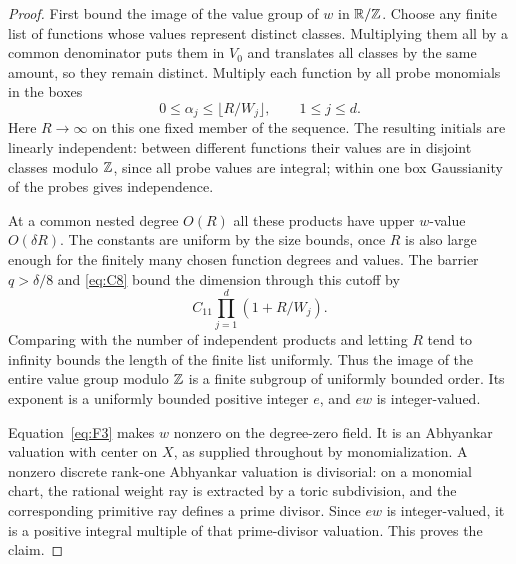 \begin{proof}
First bound the image of the value group of \(w\)
in \(\mathbb R/\mathbb Z\).  Choose any finite list of functions
whose values represent distinct classes.  Multiplying
them all by a common denominator puts them in \(V_0\)
and translates all classes by the same amount, so
they remain distinct.  Multiply each function by
all probe monomials in the boxes
\[
                    0\le\alpha_j\le\lfloor R/W_j\rfloor,
                    \qquad 1\le j\le d.
\]
Here \(R\to\infty\) on this one fixed member of the
sequence.  The resulting initials are linearly
independent: between different functions their values
are in disjoint classes modulo \(\mathbb Z\), since all
probe values are integral; within one box Gaussianity
of the probes gives independence.

At a common nested degree \(O(R)\) all these products
have upper \(w\)-value \(O(\delta R)\).  The constants
are uniform by the size bounds, once \(R\) is also
large enough for the finitely many chosen function
degrees and values.  The barrier \(q>\delta/8\) and
\eqref{eq:C8} bound the dimension through this cutoff
by
\[
                      C_{11}\prod_{j=1}^d(1+R/W_j).
\]
Comparing with the number of independent products
and letting \(R\) tend to infinity bounds the length
of the finite list uniformly.  Thus the image of the
entire value group modulo \(\mathbb Z\) is a finite subgroup
of uniformly bounded order.  Its exponent is a uniformly
bounded positive integer \(e\), and \(ew\) is
integer-valued.

Equation~\eqref{eq:F3} makes \(w\) nonzero on the
degree-zero field.  It is an Abhyankar valuation
with center on \(X\), as supplied throughout by
monomialization.  A nonzero discrete rank-one
Abhyankar valuation is divisorial: on a monomial
chart, the rational weight ray is extracted by a
toric subdivision, and the corresponding primitive
ray defines a prime divisor.  Since \(ew\) is
integer-valued, it is a positive integral multiple
of that prime-divisor valuation.  This proves the
claim.
\end{proof}

